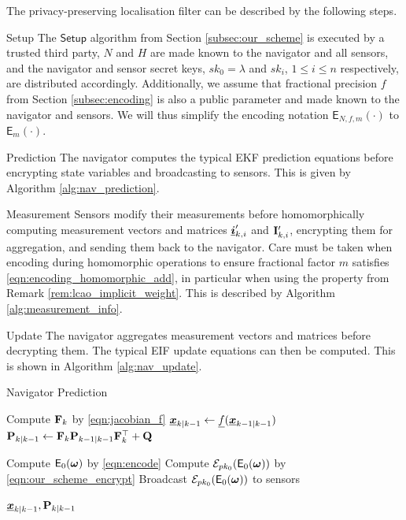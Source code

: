 \documentclass[10pt,journal,compsoc]{IEEEtran}
\theoremstyle{definition}
\theoremstyle{definition}
\theoremstyle{remark}
\begin{document}
The privacy-preserving localisation filter can be described by the following steps.
\begin{LaTeXdescription}
    \item[Setup] The $\mathsf{Setup}$ algorithm from Section \ref{subsec:our_scheme} is executed by a trusted third party, $N$ and $H$ are made known to the navigator and all sensors, and the navigator and sensor secret keys, $sk_0=\lambda$ and $sk_i$, $1 \leq i \leq n$ respectively, are distributed accordingly. Additionally, we assume that fractional precision $f$ from Section \ref{subsec:encoding} is also a public parameter and made known to the navigator and sensors. We will thus simplify the encoding notation $\mathsf{E}_{N,f,m}(\cdot)$ to $\mathsf{E}_{m}(\cdot)$.

    \item[Prediction] The navigator computes the typical EKF prediction equations before encrypting state variables and broadcasting to sensors. This is given by Algorithm \ref{alg:nav_prediction}.

    \item[Measurement] Sensors modify their measurements before homomorphically computing measurement vectors and matrices ${\boldsymbol{\underline{i}}}'_{k,i}$ and ${{\mathbf{I}}}'_{k,i}$, encrypting them for aggregation, and sending them back to the navigator. Care must be taken when encoding during homomorphic operations to ensure fractional factor $m$ satisfies \eqref{eqn:encoding_homomorphic_add}, in particular when using the property from Remark \ref{rem:lcao_implicit_weight}. This is described by Algorithm \ref{alg:measurement_info}.

    \item[Update] The navigator aggregates measurement vectors and matrices before decrypting them. The typical EIF update equations can then be computed. This is shown in Algorithm \ref{alg:nav_update}.
\end{LaTeXdescription}

\begin{algorithm}[htbp]
    \caption{Navigator Prediction}\label{alg:nav_prediction}
    \begin{algorithmic}[1]
    
        \State Compute ${{\mathbf{F}}}_k$ by \eqref{eqn:jacobian_f}
        \State ${\boldsymbol{\underline{x}}}_{k|k-1} \gets {\underline{f}}({\boldsymbol{\underline{x}}}_{k-1|k-1})$
        \State ${{\mathbf{P}}}_{k|k-1} \gets {\ensuremath{{\mathbf{F}}}}_k{{\mathbf{P}}}_{k-1|k-1}{{\mathbf{F}}}_k^\top + {{\mathbf{Q}}}$
    
            \State Compute $\mathsf{E}_{0}({\boldsymbol{\omega}})$ by \eqref{eqn:encode}
            \State Compute $\mathcal{E}_{pk_0}(\mathsf{E}_{0}({\boldsymbol{\omega}}))$ by \eqref{eqn:our_scheme_encrypt}
            \State Broadcast $\mathcal{E}_{pk_0}(\mathsf{E}_{0}({\boldsymbol{\omega}}))$ to sensors
        \EndFor
    
        \State \Return ${\boldsymbol{\underline{x}}}_{k|k-1}, {{\mathbf{P}}}_{k|k-1}$
        \EndProcedure
    \end{algorithmic}
    \end{algorithm}
\end{document}
